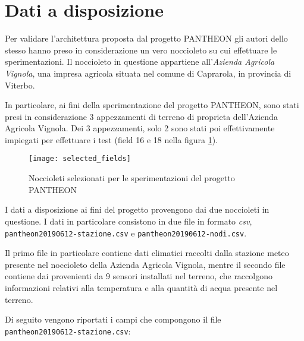 \section{Dati a disposizione} \label{dati-a-disposizione}
Per validare l'architettura proposta dal progetto PANTHEON gli autori dello stesso hanno preso in considerazione un vero noccioleto su cui effettuare le sperimentazioni. Il noccioleto in questione appartiene all'\textit{Azienda Agricola Vignola}, una impresa agricola situata nel comune di Caprarola, in provincia di Viterbo.\par

In particolare, ai fini della sperimentazione del progetto PANTHEON, sono stati presi in considerazione 3 appezzamenti di terreno di proprieta dell'Azienda Agricola Vignola. Dei 3 appezzamenti, solo 2 sono stati poi effettivamente impiegati per effettuare i test (field 16 e 18 nella figura \ref{fig:selectedfields}).

\begin{figure}[ht]
\centering
\texttt{[image: selected\_fields]}
\caption{Noccioleti selezionati per le sperimentazioni del progetto PANTHEON}
\label{fig:selectedfields}
\end{figure}

I dati a disposizione ai fini del progetto provengono dai due noccioleti in questione. I dati in particolare consistono in due file in formato \textit{csv}, \\
\texttt{pantheon20190612-stazione.csv} e \texttt{pantheon20190612-nodi.csv}.\par

Il primo file in particolare contiene dati climatici raccolti dalla stazione meteo presente nel noccioleto della Azienda Agricola Vignola, mentre il secondo file contiene dai provenienti da 9 sensori installati nel terreno, che raccolgono informazioni relativi alla temperatura e alla quantità di acqua presente nel terreno.\par

Di seguito vengono riportati i campi che compongono il file \\ \texttt{pantheon20190612-stazione.csv}:

